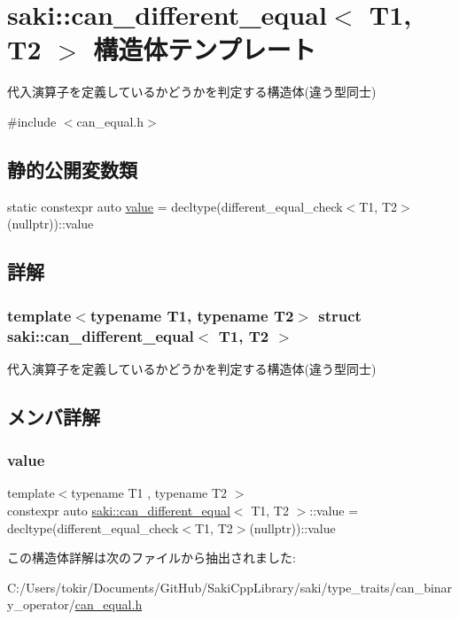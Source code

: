 \hypertarget{structsaki_1_1can__different__equal}{}\section{saki\+:\+:can\+\_\+different\+\_\+equal$<$ T1, T2 $>$ 構造体テンプレート}
\label{structsaki_1_1can__different__equal}


代入演算子を定義しているかどうかを判定する構造体(違う型同士)  




{\ttfamily \#include $<$can\+\_\+equal.\+h$>$}

\subsection*{静的公開変数類}
\begin{DoxyCompactItemize}
\item 
static constexpr auto \mbox{\hyperlink{structsaki_1_1can__different__equal_aedb8ce9a919590cf9254702057f352ae}{value}} = decltype(different\+\_\+equal\+\_\+check$<$T1, T2$>$(nullptr))\+::value
\end{DoxyCompactItemize}


\subsection{詳解}
\subsubsection*{template$<$typename T1, typename T2$>$\newline
struct saki\+::can\+\_\+different\+\_\+equal$<$ T1, T2 $>$}

代入演算子を定義しているかどうかを判定する構造体(違う型同士) 

\subsection{メンバ詳解}
\mbox{\label{structsaki_1_1can__different__equal_aedb8ce9a919590cf9254702057f352ae}} 
\subsubsection{\texorpdfstring{value}{value}}
{\footnotesize\ttfamily template$<$typename T1 , typename T2 $>$ \\
constexpr auto \mbox{\hyperlink{structsaki_1_1can__different__equal}{saki\+::can\+\_\+different\+\_\+equal}}$<$ T1, T2 $>$\+::value = decltype(different\+\_\+equal\+\_\+check$<$T1, T2$>$(nullptr))\+::value\hspace{0.3cm}{\ttfamily [static]}}



この構造体詳解は次のファイルから抽出されました\+:\begin{DoxyCompactItemize}
\item 
C\+:/\+Users/tokir/\+Documents/\+Git\+Hub/\+Saki\+Cpp\+Library/saki/type\+\_\+traits/can\+\_\+binary\+\_\+operator/\mbox{\hyperlink{can__equal_8h}{can\+\_\+equal.\+h}}\end{DoxyCompactItemize}
